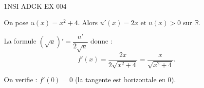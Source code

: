 \begin{corrige}{1NSI-ADGK-EX-004}

On pose $u(x) = x^2+4$. Alors $u'(x) = 2x$ et $u(x) > 0$ sur $\mathbb{R}$.


La formule $(\sqrt{u})' = \dfrac{u'}{2\sqrt{u}}$ donne :
\[ f'(x) = \frac{2x}{2\sqrt{x^2+4}} = \frac{x}{\sqrt{x^2+4}}. \]

On verifie : $f'(0) = 0$ (la tangente est horizontale en $0$).

\end{corrige}
